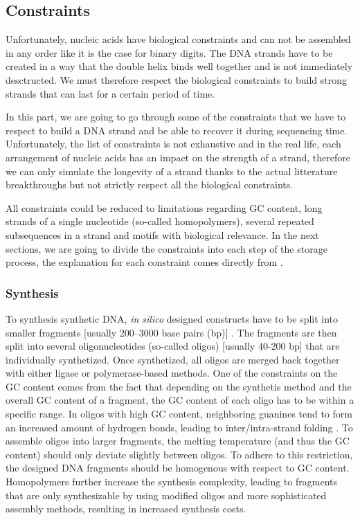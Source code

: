 \subsection{Constraints}

Unfortunately, nucleic acids have biological constraints and can not be assembled in any order like it is the case for binary digits. The DNA strands have to be created in a way that the double helix binds well together and is not immediately desctructed. We must therefore respect the biological constraints to build strong strands that can last for a certain period of time. 

In this part, we are going to go through some of the constraints that we have to respect to build a DNA strand and be able to recover it during sequencing time. Unfortunately, the list of constraints is not exhaustive and in the real life, each arrangement of nucleic acids has an impact on the strength of a strand, therefore we can only simulate the longevity of a strand thanks to the actual litterature breakthroughs but not strictly respect all the biological constraints. 

All constraints could be reduced to limitations regarding GC content, long strands of a single nucleotide (so-called homopolymers), several repeated subsequences in a strand and motifs with biological relevance. In the next sections, we are going to divide the constraints into each step of the storage process, the explanation for each constraint comes directly from \cite{bib:10.1093/bioinformatics/btaa140}.

\subsubsection{Synthesis}

To synthesis synthetic DNA, \textit{in silico} designed constructs have to be split into smaller fragments [usually 200–3000 base pairs (bp)] \cite{bib:101038}. The fragments are then split into several oligonucleotides (so-called oligos) [usually 40-200 bp] that are individually synthetized. Once synthetized, all oligos are merged back together with either ligase or polymerase-based methods. One of the constraints on the GC content comes from the fact that depending on the synthetis method and the overall GC content of a fragment,  the GC content of each oligo has to be within a specific range. In oligos with high GC content, neighboring guanines tend to form an increased amount of hydrogen bonds, leading to inter/intra-strand folding \cite{bib:101371}.
To assemble oligos into larger fragments, the melting temperature (and thus the GC content) should only deviate slightly between oligos. To adhere to this restriction, the designed DNA fragments should be homogenous with respect to GC content. Homopolymers further increase the synthesis complexity, leading to fragments that are only synthesizable by using modified oligos and more sophisticated assembly methods, resulting in increased synthesis costs.

